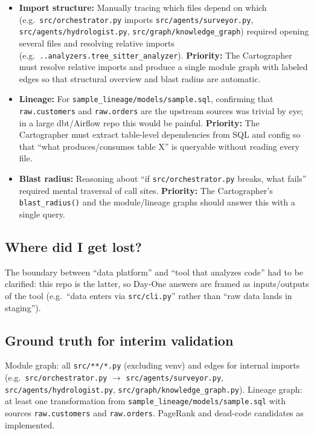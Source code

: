 \documentclass[11pt,a4paper]{article}
\begin{document}
\begin{itemize}
  \item \textbf{Import structure:} Manually tracing which files depend on which (e.g.\ \texttt{src/orchestrator.py} imports \texttt{src/agents/surveyor.py}, \texttt{src/agents/hydrologist.py}, \texttt{src/graph/knowledge\_graph}) required opening several files and resolving relative imports (e.g.\ \texttt{..analyzers.tree\_sitter\_analyzer}). \textbf{Priority:} The Cartographer must resolve relative imports and produce a single module graph with labeled edges so that structural overview and blast radius are automatic.
  \item \textbf{Lineage:} For \texttt{sample\_lineage/models/sample.sql}, confirming that \texttt{raw.customers} and \texttt{raw.orders} are the upstream sources was trivial by eye; in a large dbt/Airflow repo this would be painful. \textbf{Priority:} The Cartographer must extract table-level dependencies from SQL and config so that ``what produces/consumes table X'' is queryable without reading every file.
  \item \textbf{Blast radius:} Reasoning about ``if \texttt{src/orchestrator.py} breaks, what fails'' required mental traversal of call sites. \textbf{Priority:} The Cartographer's \texttt{blast\_radius()} and the module/lineage graphs should answer this with a single query.
\end{itemize}

\subsection{Where did I get lost?}

The boundary between ``data platform'' and ``tool that analyzes code'' had to be clarified: this repo is the latter, so Day-One answers are framed as inputs/outputs of the tool (e.g.\ ``data enters via \texttt{src/cli.py}'' rather than ``raw data lands in staging'').

\subsection{Ground truth for interim validation}

Module graph: all \texttt{src/**/*.py} (excluding venv) and edges for internal imports (e.g.\ \texttt{src/orchestrator.py} $\rightarrow$ \texttt{src/agents/surveyor.py}, \texttt{src/agents/hydrologist.py}, \texttt{src/graph/knowledge\_graph.py}). Lineage graph: at least one transformation from \texttt{sample\_lineage/models/sample.sql} with sources \texttt{raw.customers} and \texttt{raw.orders}. PageRank and dead-code candidates as implemented.
\end{document}
